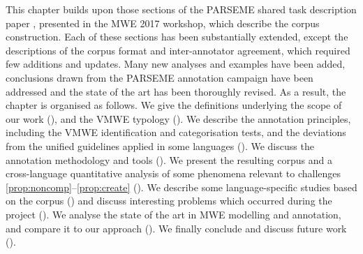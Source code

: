\documentclass[output=paper,
modfonts,
]{langscibook}
\begin{document}
This chapter builds upon those sections of the PARSEME shared task description paper \citep{MWEWorkshop}, presented in the MWE 2017 workshop, which describe the corpus construction. 
Each of these sections has been substantially extended, except the descriptions of the corpus format and inter-annotator agreement, which required few additions and updates. Many new analyses and examples have been added, conclusions drawn from the PARSEME annotation campaign have been addressed and the state of the art has been thoroughly revised. As a result, the chapter is organised as follows. 
We give the definitions underlying the scope of our work (), and the VMWE typology (). 
We describe the annotation principles, including 
the VMWE identification and categorisation tests, %
and the deviations from the unified guidelines applied in some languages ().
We discuss the annotation methodology and tools (). We present the resulting corpus and a cross-language quantitative analysis of some phenomena relevant to challenges \ref{prop:noncomp}--\ref{prop:create} (). 
We describe some language-specific studies based on the corpus () and discuss interesting problems which occurred during the project ().
We analyse the state of the art in MWE modelling and annotation, and compare it to our approach (). We finally conclude and discuss future work ().   


\end{document}
